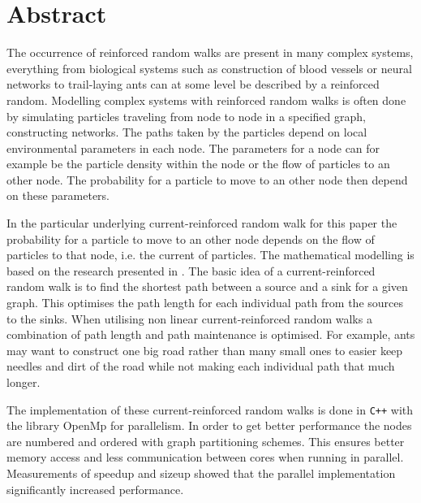 \section{Abstract}
\label{sec:abstract}

The occurrence of reinforced random walks are present in many complex systems, everything from biological systems such as construction of blood vessels or neural networks to trail-laying ants can at some level be described by a reinforced random. Modelling complex systems with reinforced random walks is often done by simulating particles traveling from node to node in a specified graph, constructing networks. The paths taken by the particles depend on local environmental parameters in each node. The parameters for a node can for example be the particle density within the node or the flow of particles to an other node. The probability for a particle to move to an other node then depend on these parameters.

In the particular underlying current-reinforced random walk for this paper the probability for a particle to move to an other node depends on the flow of particles to that node, i.e. the current of particles. The mathematical modelling is based on the research presented in \cite{Sumpter}. The basic idea of a current-reinforced random walk is to find the shortest path between a source and a sink for a given graph. This optimises the path length for each individual path from the sources to the sinks. When utilising non linear current-reinforced random walks a combination of path length and path maintenance is optimised. For example, ants may want to construct one big road rather than many small ones to easier keep needles and dirt of the road while not making each individual path that much longer.

The implementation of these current-reinforced random walks is done in \texttt{C++} with the library OpenMp for parallelism. In order to get better performance the nodes are numbered and ordered with graph partitioning schemes. This ensures better memory access and less communication between cores when running in parallel. Measurements of speedup and sizeup showed that the parallel implementation significantly increased performance. 